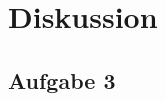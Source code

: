 \documentclass[12pt]{scrartcl}
\begin{document}
\section{Diskussion}


\subsection{Aufgabe 3}


\end{document}
